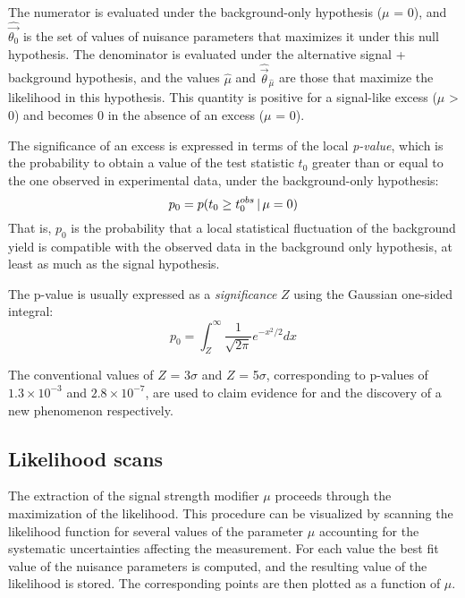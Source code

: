 The numerator is evaluated under the background-only hypothesis ($\mu$ = 0), and $\widehat{\vec{\theta_0}}$ is the set of values of nuisance parameters that maximizes it under this null hypothesis.
The denominator is evaluated under the alternative signal + background hypothesis,
and the values $\hat{\mu}$ and $\widehat{\vec{\theta}}_{\hat\mu}$
are those that maximize the likelihood in this hypothesis.
This quantity is positive for a signal-like excess ($\mu$ > 0) and becomes 0 in the absence of an excess ($\mu$ = 0).

The significance of an excess is expressed in terms of the local \textit{p-value}, which is the probability to obtain a value of the test statistic $t_0$ greater than or equal to the one observed in experimental data, under the background-only hypothesis:
\begin{equation}
  \label{eq:pvalue}
  p_0 = p(t_0 \ge t_0^{obs}\, |\, \mu = 0)
\end{equation}
That is, $p_0$ is the probability that a local statistical fluctuation of the background yield
is compatible with the observed data in the background only hypothesis,
at least as much as the signal hypothesis.

The p-value is usually expressed as a \textit{significance} $Z$ using the Gaussian one-sided integral:
\begin{equation}
  \label{eq:significance}
  p_0 = \int_Z^\infty \frac{1}{\sqrt{2\pi}}e^{-x^2/2}dx
\end{equation}

The conventional values of $Z$ = 3$\sigma$ and $Z$ = 5$\sigma$, corresponding to p-values of $1.3 \times 10^{-3}$ and $2.8 \times 10^{-7}$, are used to claim evidence for and the discovery of a new phenomenon respectively.


\subsection{Likelihood scans}
\label{sec:likelihood_scans}
The extraction of the signal strength modifier $\mu$ proceeds through the maximization of the likelihood.
This procedure can be visualized by scanning the likelihood function for several values of the parameter $\mu$
accounting for the systematic uncertainties affecting the measurement.
For each value the best fit value of the nuisance parameters is computed,
and the resulting value of the likelihood is stored.
The corresponding points are then plotted as a function of $\mu$.

